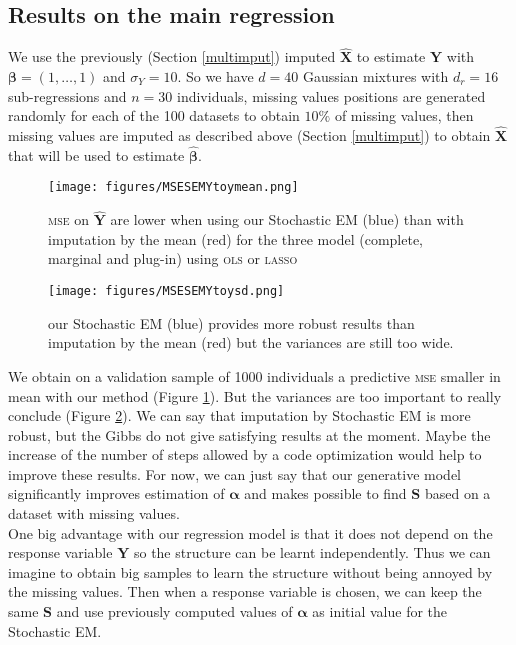 \documentclass[12pt,a4paper]{report}
\begin{document}
		\subsection{Results on the main regression}
		We use the previously (Section \ref{multimput}) imputed $\hat{\boldsymbol{X}}$ to estimate $\boldsymbol{Y}$ with $\boldsymbol{\beta}=(1,\dots,1)$ and $\sigma_Y=10$. So we have $d=40$ Gaussian mixtures with $d_r=16$ sub-regressions and $n=30$ individuals,  missing values positions are generated randomly for each of the 100 datasets to obtain $10 \%$ of missing values, then missing values are imputed as described above (Section \ref{multimput}) to obtain $\hat{\boldsymbol{X}}$ that will be used to estimate $\hat{\boldsymbol{\beta}}$.
			\begin{figure}[h!]
	\centering
	\texttt{[image: figures/MSESEMYtoymean.png]} 
	\caption{\textsc{mse} on $\hat{\boldsymbol{Y}}$ are lower when using our Stochastic EM (blue) than with imputation by the mean (red) for the three model (complete, marginal and plug-in) using \textsc{ols} or \textsc{lasso}}\label{MSESEMYtoymean}
\end{figure}	

			\begin{figure}[h!]
	\centering
	\texttt{[image: figures/MSESEMYtoysd.png]} 
	\caption{our Stochastic EM (blue) provides more robust results than imputation by the mean (red) but the variances are still too wide.}\label{MSESEMYtoysd}
\end{figure}		
We obtain on a validation sample of 1000 individuals a predictive \textsc{mse} smaller in mean with our method (Figure \ref{MSESEMYtoymean}). But the variances are too important to really conclude (Figure \ref{MSESEMYtoysd}). We can say that imputation by Stochastic EM is more robust, but the Gibbs do not give satisfying results at the moment. Maybe the increase of the number of steps allowed by a code optimization would help to improve these results. For now, we can just say that our generative model significantly improves estimation of $\boldsymbol{\alpha}$ and makes possible to find $\boldsymbol{S}$ based on a dataset with missing values.\\

		One big advantage with our regression model is that it does not depend on the response variable $\boldsymbol{Y}$ so the structure can be learnt independently. Thus we can imagine to obtain big samples to learn the structure without being annoyed by the missing values. Then when a response variable is chosen, we can keep the same $\boldsymbol{S}$ and use previously computed values of $\boldsymbol{\alpha}$ as initial value for the Stochastic EM. 
\end{document}
